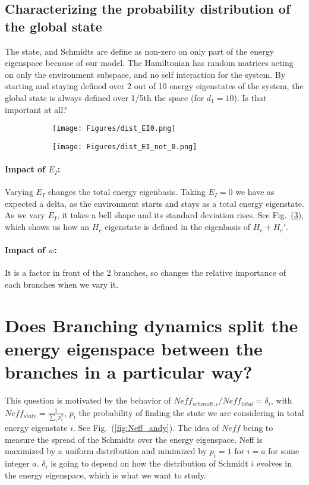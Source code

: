 \documentclass{article}
\begin{document}
\subsection{Characterizing the probability distribution of the global state}

The state, and Schmidts are define as non-zero on only part of the energy eigenspace because of our model. The Hamiltonian has random matrices acting on only the environment subspace, and no self interaction for the system. By starting and staying defined over 2 out of 10 energy eigenstates of the system, the global state is always defined over 1/5th the space (for $d_1=10$). Is that important at all? \\

\begin{figure}[h!]
  \centering
  \begin{subfigure}[b]{0.4\linewidth}
    \texttt{[image: Figures/dist\_EI0.png]}
    \label{fig:1}
  \end{subfigure}
  \begin{subfigure}[b]{0.4\linewidth}
    \texttt{[image: Figures/dist\_EI\_not\_0.png]}
    \label{fig:2}
  \end{subfigure}
  \caption{}
  \label{fig:dist_EI_dep}
\end{figure}

\paragraph{Impact of $E_I$: }Varying $E_I$ changes the total energy eigenbasis. Taking $E_I=0$ we have as expected a delta, as the environment starts and stays as a total energy eigenstate. As we vary $E_I$, it takes a bell shape and its standard deviation rises. See Fig.~(\ref{fig:dist_EI_dep}), which shows us how an $H_e$ eigenstate is defined in the eigenbasis of $H_e+H_e'$. 

\paragraph{Impact of $w$: }It is a factor in front of the 2 branches, so changes the relative importance of each branches when we vary it.

\section{Does Branching dynamics split the energy eigenspace between the branches in a particular way?}
This question is motivated by the behavior of $Neff_{schmidt,i}/Neff_{total}=\delta_i$, with $Neff_{state}=\frac{1}{\sum_ip_i^2}$, $p_i$ the probability of finding the state we are considering in total energy eigenstate $i$. See Fig.~(\ref{fig:Neff_andy}). The idea of $Neff$ being to measure the spread of the Schmidts over the energy eigenspace. Neff is maximized by a uniform distribution and minimized by $p_i=1\text{ for }i=a$ for some integer $a$. $\delta_i$ is going to depend on how the distribution of Schmidt $i$ evolves in the energy eigenspace, which is what we want to study.
\end{document}
